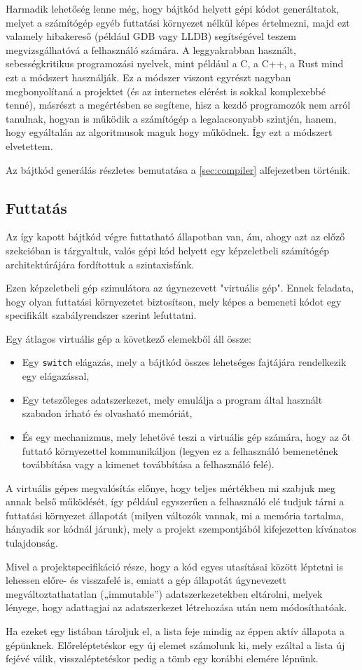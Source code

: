 Harmadik lehetőség lenne még, hogy bájtkód helyett gépi kódot generáltatok, melyet a számítógép egyéb futtatási környezet nélkül képes értelmezni, majd ezt valamely hibakereső (például GDB vagy LLDB) segítségével teszem megvizsgálhatóvá a felhasználó számára. A leggyakrabban használt, sebességkritikus programozási nyelvek, mint például a C, a C++, a Rust mind ezt a módszert használják. Ez a módszer viszont egyrészt nagyban megbonyolítaná a projektet (és az internetes elérést is sokkal komplexebbé tenné), másrészt a megértésben se segítene, hisz a kezdő programozók nem arról tanulnak, hogyan is működik a számítógép a legalacsonyabb szintjén, hanem, hogy egyáltalán az algoritmusok maguk hogy működnek. Így ezt a módszert elvetettem.

Az bájtkód generálás részletes bemutatása a \ref{sec:compiler} alfejezetben történik.

\subsection{Futtatás}

Az így kapott bájtkód végre futtatható állapotban van, ám, ahogy azt az előző szekcióban is tárgyaltuk, valós gépi kód helyett egy képzeletbeli számítógép architektúrájára fordítottuk a szintaxisfánk.

Ezen képzeletbeli gép szimulátora az úgynezevett "virtuális gép". Ennek feladata, hogy olyan futtatási környezetet biztosítson, mely képes a bemeneti kódot egy specifikált szabályrendszer szerint lefuttatni.

Egy átlagos virtuális gép a következő elemekből áll össze:

\begin{itemize}
    \item Egy \texttt{switch} elágazás, mely a bájtkód összes lehetséges fajtájára rendelkezik egy elágazással,
    \item Egy tetszőleges adatszerkezet, mely emulálja a program által használt szabadon írható és olvasható memóriát,
    \item És egy mechanizmus, mely lehetővé teszi a virtuális gép számára, hogy az őt futtató környezettel kommunikáljon (legyen ez a felhasználó bemenetének továbbítása vagy a kimenet továbbítása a felhasználó felé).
\end{itemize}

A virtuális gépes megvalósítás előnye, hogy teljes mértékben mi szabjuk meg annak belső működését, így például egyszerűen a felhasználó elé tudjuk tárni a futtatási környezet állapotát (milyen változók vannak, mi a memória tartalma, hányadik sor kódnál járunk), mely a projekt szempontjából kifejezetten kívánatos tulajdonság.

Mivel a projektspecifikáció része, hogy a kód egyes utasításai között léptetni is lehessen előre- és visszafelé is, emiatt a gép állapotát úgynevezett megváltoztathatatlan („immutable”) adatszerkezetekben eltárolni, melyek lényege, hogy adattagjai az adatszerkezet létrehozása után nem módosíthatóak. 

Ha ezeket egy listában tároljuk el, a lista feje mindig az éppen aktív állapota a gépünknek. Előreléptetéskor egy új elemet számolunk ki, mely ezáltal a lista új fejévé válik, visszaléptetéskor pedig a tömb egy korábbi elemére lépnünk.